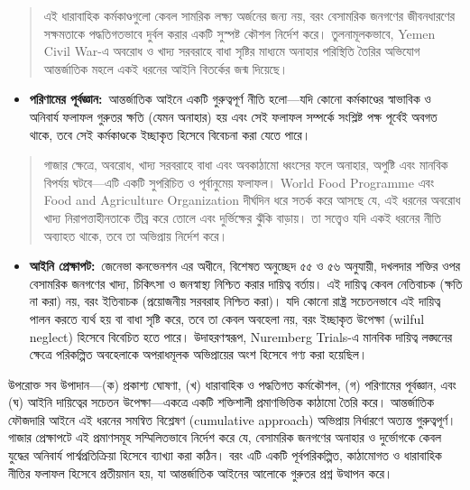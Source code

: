 \begin{quote}
এই ধারাবাহিক কর্মকাণ্ডগুলো কেবল সামরিক লক্ষ্য অর্জনের জন্য নয়, বরং বেসামরিক
জনগণের জীবনধারণের সক্ষমতাকে পদ্ধতিগতভাবে দুর্বল করার একটি সুস্পষ্ট কৌশল নির্দেশ
করে। তুলনামূলকভাবে, Yemen Civil War-এ অবরোধ ও খাদ্য সরবরাহে বাধা সৃষ্টির
মাধ্যমে অনাহার পরিস্থিতি তৈরির অভিযোগ আন্তর্জাতিক মহলে একই ধরনের আইনি
বিতর্কের জন্ম দিয়েছে।
\end{quote}

\begin{itemize}
\item
  \textbf{পরিণামের পূর্বজ্ঞান:}~আন্তর্জাতিক আইনে একটি গুরুত্বপূর্ণ নীতি হলো---যদি
  কোনো কর্মকাণ্ডের স্বাভাবিক ও অনিবার্য ফলাফল গুরুতর ক্ষতি (যেমন অনাহার) হয় এবং
  সেই ফলাফল সম্পর্কে সংশ্লিষ্ট পক্ষ পূর্বেই অবগত থাকে, তবে সেই কর্মকাণ্ডকে ইচ্ছাকৃত
  হিসেবে বিবেচনা করা যেতে পারে।
\end{itemize}

\begin{quote}
গাজার ক্ষেত্রে, অবরোধ, খাদ্য সরবরাহে বাধা এবং অবকাঠামো ধ্বংসের ফলে অনাহার,
অপুষ্টি এবং মানবিক বিপর্যয় ঘটবে---এটি একটি সুপরিচিত ও পূর্বানুমেয় ফলাফল। World
Food Programme এবং Food and Agriculture Organization দীর্ঘদিন ধরে সতর্ক
করে আসছে যে, এই ধরনের অবরোধ খাদ্য নিরাপত্তাহীনতাকে তীব্র করে তোলে এবং
দুর্ভিক্ষের ঝুঁকি বাড়ায়। তা সত্ত্বেও যদি একই ধরনের নীতি অব্যাহত থাকে, তবে তা
অভিপ্রায় নির্দেশ করে।
\end{quote}

\begin{itemize}
\item
  \textbf{আইনি প্রেক্ষাপট:}~জেনেভা কনভেনশন এর অধীনে, বিশেষত অনুচ্ছেদ ৫৫ ও ৫৬
  অনুযায়ী, দখলদার শক্তির ওপর বেসামরিক জনগণের খাদ্য, চিকিৎসা ও জনস্বাস্থ্য
  নিশ্চিত করার দায়িত্ব বর্তায়। এই দায়িত্ব কেবল নেতিবাচক (ক্ষতি না করা) নয়,
  বরং ইতিবাচক (প্রয়োজনীয় সরবরাহ নিশ্চিত করা)। যদি কোনো রাষ্ট্র সচেতনভাবে এই
  দায়িত্ব পালন করতে ব্যর্থ হয় বা বাধা সৃষ্টি করে, তবে তা কেবল অবহেলা নয়, বরং
  ইচ্ছাকৃত উপেক্ষা (wilful neglect) হিসেবে বিবেচিত হতে পারে। উদাহরণস্বরূপ,
  Nuremberg Trials-এ মানবিক দায়িত্ব লঙ্ঘনের ক্ষেত্রে পরিকল্পিত অবহেলাকে
  অপরাধমূলক অভিপ্রায়ের অংশ হিসেবে গণ্য করা হয়েছিল।
\end{itemize}

উপরোক্ত সব উপাদান---(ক) প্রকাশ্য ঘোষণা, (খ) ধারাবাহিক ও পদ্ধতিগত কর্মকৌশল,
(গ) পরিণামের পূর্বজ্ঞান, এবং (ঘ) আইনি দায়িত্বের সচেতন উপেক্ষা---একত্রে একটি
শক্তিশালী প্রমাণভিত্তিক কাঠামো তৈরি করে। আন্তর্জাতিক ফৌজদারি আইনে এই ধরনের
সমন্বিত বিশ্লেষণ (cumulative approach) অভিপ্রায় নির্ধারণে অত্যন্ত গুরুত্বপূর্ণ।
গাজার প্রেক্ষাপটে এই প্রমাণসমূহ সম্মিলিতভাবে নির্দেশ করে যে, বেসামরিক জনগণের
অনাহার ও দুর্ভোগকে কেবল যুদ্ধের অনিবার্য পার্শ্বপ্রতিক্রিয়া হিসেবে ব্যাখ্যা করা
কঠিন। বরং এটি একটি পূর্বপরিকল্পিত, কাঠামোগত ও ধারাবাহিক নীতির ফলাফল হিসেবে
প্রতীয়মান হয়, যা আন্তর্জাতিক আইনের আলোকে গুরুতর প্রশ্ন উত্থাপন করে।

